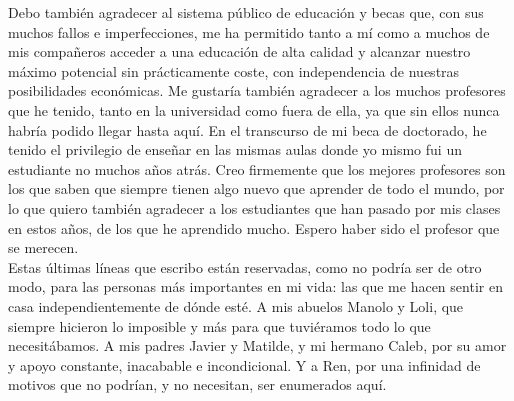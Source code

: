 {Debo también agradecer al sistema público de educación y becas que, con sus muchos fallos e imperfecciones, me ha permitido tanto a mí como a muchos de mis compañeros acceder a una educación de alta calidad y alcanzar nuestro máximo potencial sin prácticamente coste, con independencia de nuestras posibilidades económicas. Me gustaría también agradecer a los muchos profesores que he tenido, tanto en la universidad como fuera de ella, ya que sin ellos nunca habría podido llegar hasta aquí. En el transcurso de mi beca de doctorado, he tenido el privilegio de enseñar en las mismas aulas donde yo mismo fui un estudiante no muchos años atrás. Creo firmemente que los mejores profesores son los que saben que siempre tienen algo nuevo que aprender de todo el mundo, por lo que quiero también agradecer a los estudiantes que han pasado por mis clases en estos años, de los que he aprendido mucho. Espero haber sido el profesor que se merecen.\\

Estas últimas líneas que escribo están reservadas, como no podría ser de otro modo, para las personas más importantes en mi vida: las que me hacen sentir en casa independientemente de dónde esté. A mis abuelos Manolo y Loli, que siempre hicieron lo imposible y más para que tuviéramos todo lo que necesitábamos. A mis padres Javier y Matilde, y mi hermano Caleb, por su amor y apoyo constante, inacabable e incondicional. Y a Ren, por una infinidad de motivos que no podrían, y no necesitan, ser enumerados aquí.
}

